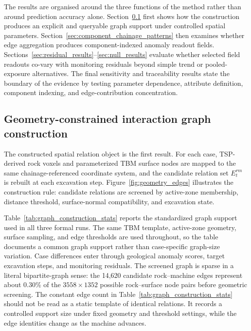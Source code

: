 \label{sec:results}
The results are organised around the three functions of the method rather than
around prediction accuracy alone. Section~\ref{sec:constructed_graphs} first
shows how the construction produces an explicit and queryable graph support
under controlled spatial parameters.
Section~\ref{sec:component_chainage_patterns} then examines whether edge
aggregation produces component-indexed anomaly readout fields.
Sections~\ref{sec:residual_results}--\ref{sec:null_results} evaluate whether
selected field readouts co-vary with monitoring residuals beyond simple trend
or pooled-exposure alternatives. The final sensitivity and traceability
results state the boundary of the evidence by testing parameter dependence,
attribute definition, component indexing, and edge-contribution concentration.

\subsection{Geometry-constrained interaction graph construction}
\label{sec:constructed_graphs}
The constructed spatial relation object is the first result. For each case,
TSP-derived rock voxels and parameterized TBM surface nodes are mapped to the
same chainage-referenced coordinate system, and the candidate relation set
$E_t^{rm}$ is rebuilt at each excavation step. Figure~\ref{fig:geometry_edges}
illustrates the construction rule: candidate relations are screened by
active-zone membership, distance threshold, surface-normal compatibility, and
excavation state.

Table~\ref{tab:graph_construction_stats} reports the standardized graph support
used in all three formal runs. The same TBM template, active-zone geometry,
surface sampling, and edge thresholds are used throughout, so the table
documents a common graph support rather than case-specific graph-size
variation. Case differences enter through geological anomaly scores, target
excavation steps, and monitoring residuals.
The screened graph is sparse in a literal bipartite-graph sense: the 14,620
candidate rock--machine edges represent about 0.30\% of the
$3558\times1352$ possible rock--surface node pairs before geometric screening.
The constant edge count in Table~\ref{tab:graph_construction_stats} should not
be read as a static template of identical relations. It records a controlled
support size under fixed geometry and threshold settings, while the edge
identities change as the machine advances.

